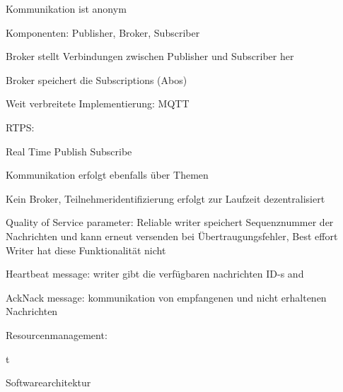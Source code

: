 \begin{notes}
\begin{notes}
\begin{notes}
                \item Kommunikation ist anonym
                \item Komponenten: Publisher, Broker, Subscriber
                \item Broker stellt Verbindungen zwischen Publisher und Subscriber her
                \item Broker speichert die Subscriptions (Abos)
                \item Weit verbreitete Implementierung: MQTT
                \item RTPS:
                \begin{notes}
                    \item Real Time Publish Subscribe
                    \item Kommunikation erfolgt ebenfalls über Themen
                    \item Kein Broker, Teilnehmeridentifizierung erfolgt zur Laufzeit dezentralisiert
                    \item Quality of Service parameter: Reliable writer speichert Sequenznummer der Nachrichten und kann erneut versenden bei Übertraugungsfehler, Best effort Writer hat diese Funktionalität nicht
                    \item Heartbeat message: writer gibt die verfügbaren nachrichten ID-s and
                    \item AckNack message: kommunikation von empfangenen und nicht erhaltenen Nachrichten
                \end{notes}
            \end{notes}
    \end{notes}
    \item Resourcenmanagement:
    \begin{notes}
        \item t
    \end{notes}
    \item Softwarearchitektur
    \item 
\end{notes}


